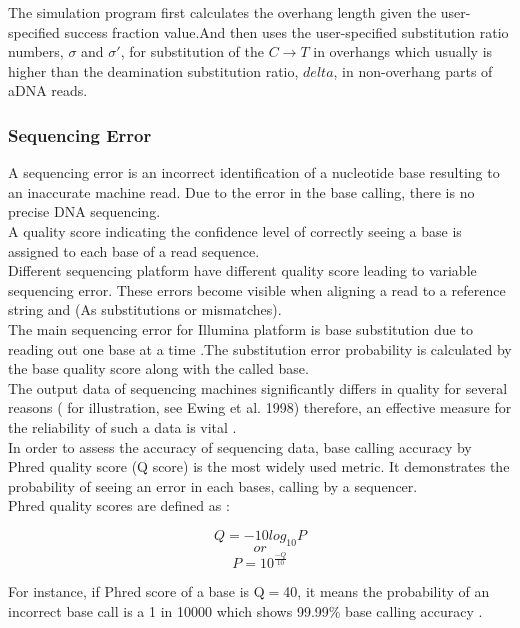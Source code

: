 \documentclass[11pt,a4paper]{report}
\begin{document}
The simulation program first calculates the overhang length given the user-specified 
success fraction value.And then uses the user-specified substitution ratio numbers,
 $ \sigma $ and $\sigma\prime $, for substitution of the $ C \rightarrow T $ in 
overhangs which usually is higher than the deamination substitution ratio, $delta$, 
in non-overhang parts of aDNA reads.

 
\subsubsection{Sequencing Error}
 

A sequencing error is an incorrect identification of a nucleotide base resulting 
to an inaccurate machine read. Due to the error in the base calling, there is no 
precise DNA sequencing. \\
A quality score indicating the confidence level of correctly seeing a base is 
assigned to each base of a read sequence.\\
Different sequencing platform have different quality score leading to variable 
sequencing error. These errors become visible when aligning a read to a reference 
string and (As substitutions or mismatches).\\
The main sequencing error for Illumina platform is base substitution due to 
reading out one base at a time \cite{art}.The substitution error probability is 
calculated by the base quality score along with the called base.\\


The output data of sequencing machines significantly differs in quality for 
several reasons ( for illustration, see Ewing et al. 1998) therefore, an effective 
measure for the reliability of such a data is vital \cite{phred1}.\\

In order to assess the accuracy of sequencing data, base calling accuracy by Phred 
quality score (Q score) is the most widely used metric. It demonstrates the probability 
of seeing an error in each bases, calling by a sequencer.\\

Phred quality scores are defined as \cite{phred2}:

$$ Q = -10  log_{10}P   $$
$$  or $$
$$ P = 10 ^ { \frac{-Q}{ 10 } } $$

For instance, if Phred score of a base is Q$=$40, it means the probability of an 
incorrect base call is a 1 in 10000 which shows 99.99\% base calling accuracy 
\cite{IlluminaPhred}. \\  
\end{document}
